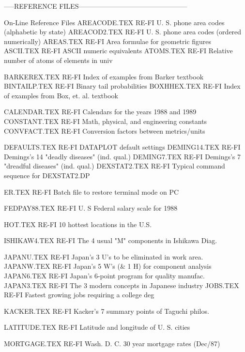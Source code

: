 -----REFERENCE FILES------------------------------------------------

On-Line Reference Files
AREACODE.TEX                RE-FI U. S. phone area codes (alphabetic by state)
AREACOD2.TEX                RE-FI U. S. phone area codes (ordered numerically)
AREAS.TEX                   RE-FI Area formulae for geometric figures
ASCII.TEX                   RE-FI ASCII numeric equivalents
ATOMS.TEX                   RE-FI Relative number of atoms of elements in univ

BARKEREX.TEX                RE-FI Index of examples from Barker textbook
BINTAILP.TEX                RE-FI Binary tail probabilities
BOXHHEX.TEX                 RE-FI Index of examples from Box, et. al. textbook

CALENDAR.TEX                RE-FI Calendars for the years 1988 and 1989
CONSTANT.TEX                RE-FI Math, physical, and engineering constants
CONVFACT.TEX                RE-FI Conversion factors between metrics/units

DEFAULTS.TEX                RE-FI DATAPLOT default settings
DEMING14.TEX                RE-FI Demings's 14 "deadly diseases" (ind. qual.)
DEMING7.TEX                 RE-FI Demings's 7 "dreadful diseases" (ind. qual.)
DEXSTAT2.TEX                RE-FI Typical command sequence for DEXSTAT2.DP

ER.TEX                      RE-FI Batch file to restore terminal mode on PC

FEDPAY88.TEX                RE-FI U. S Federal salary scale for 1988

HOT.TEX                     RE-FI 10 hottest locations in the U.S.

ISHIKAW4.TEX                RE-FI The 4 usual "M" components in Ishikawa Diag.

JAPANU.TEX                  RE-FI Japan's 3  U's to be eliminated in work area.
JAPANW.TEX                  RE-FI Japan's 5 W's (& 1 H) for component analysis
JAPAN6.TEX                  RE-FI Japan's 6-point program for quality manufac.
JAPAN3.TEX                  RE-FI The 3 modern concepts in Japanese industry
JOBS.TEX                    RE-FI Fastest growing jobs requiring a college deg

KACKER.TEX                  RE-FI Kacker's 7 summary points of Taguchi philos.

LATITUDE.TEX                RE-FI Latitude and longitude of U. S. cities

MORTGAGE.TEX                RE-FI Wash. D. C. 30 year mortgage rates (Dec/87)

